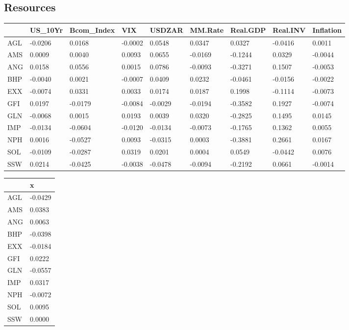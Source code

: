 \documentclass[11pt,preprint, authoryear]{elsarticle}
\let\origtable\table
\let\endorigtable\endtable
\renewenvironment{table}[1][2] {
    \expandafter\origtable\expandafter[H]
} {
    \endorigtable
}
\numberwithin{equation}{section}
\numberwithin{figure}{section}
\numberwithin{table}{section}
\begin{document}
\newpage

\hypertarget{resources}{%
\subsection{Resources}\label{resources}}

\begin{table}[H]

\caption{\label{tab:Beta_R}Factor Beta's: Resources}
\centering
\begin{tabular}[t]{l|l|l|l|l|l|l|l|l}
\hline
  & US\_10Yr & Bcom\_Index & VIX & USDZAR & MM.Rate & Real.GDP & Real.INV & Inflation\\
\hline
AGL & -0.0206 & 0.0168 & -0.0002 & 0.0548 & 0.0347 & 0.0327 & -0.0416 & 0.0011\\
\hline
AMS & 0.0009 & 0.0040 & 0.0093 & 0.0655 & -0.0169 & -0.1244 & 0.0329 & -0.0044\\
\hline
ANG & 0.0158 & 0.0556 & 0.0015 & 0.0786 & -0.0093 & -0.3271 & 0.1507 & -0.0053\\
\hline
BHP & -0.0040 & 0.0021 & -0.0007 & 0.0409 & 0.0232 & -0.0461 & -0.0156 & -0.0022\\
\hline
EXX & -0.0074 & 0.0331 & 0.0033 & 0.0174 & 0.0187 & 0.1998 & -0.1114 & -0.0073\\
\hline
GFI & 0.0197 & -0.0179 & -0.0084 & -0.0029 & -0.0194 & -0.3582 & 0.1927 & -0.0074\\
\hline
GLN & -0.0068 & 0.0015 & 0.0193 & 0.0039 & 0.0320 & -0.2825 & 0.1495 & 0.0145\\
\hline
IMP & -0.0134 & -0.0604 & -0.0120 & -0.0134 & -0.0073 & -0.1765 & 0.1362 & 0.0055\\
\hline
NPH & 0.0016 & -0.0527 & 0.0093 & -0.0315 & 0.0003 & -0.3881 & 0.2661 & 0.0167\\
\hline
SOL & -0.0109 & -0.0287 & 0.0319 & 0.0201 & 0.0004 & 0.0549 & -0.0442 & 0.0076\\
\hline
SSW & 0.0214 & -0.0425 & -0.0038 & -0.0478 & -0.0094 & -0.2192 & 0.0661 & -0.0014\\
\hline
\end{tabular}
\end{table}

\begin{table}[H]

\caption{\label{tab:Alpha_R}Factor Alpha's: Resources}
\centering
\begin{tabular}[t]{l|l}
\hline
  & x\\
\hline
AGL & -0.0429\\
\hline
AMS & 0.0383\\
\hline
ANG & 0.0063\\
\hline
BHP & -0.0398\\
\hline
EXX & -0.0184\\
\hline
GFI & 0.0222\\
\hline
GLN & -0.0557\\
\hline
IMP & 0.0317\\
\hline
NPH & -0.0072\\
\hline
SOL & 0.0095\\
\hline
SSW & 0.0000\\
\hline
\end{tabular}
\end{table}
\end{document}
